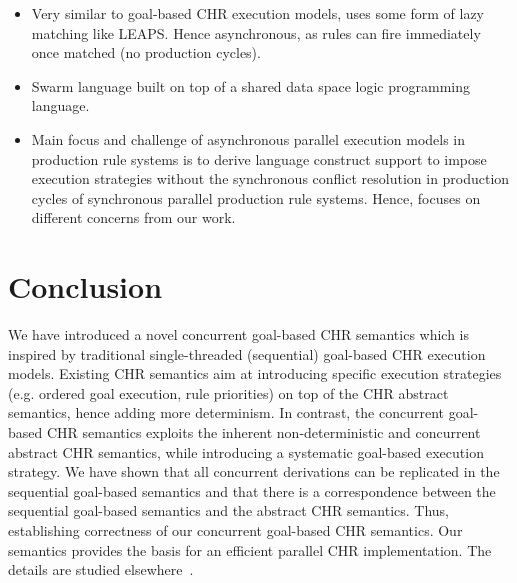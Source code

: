 \documentclass{tlp}
\begin{document}
{\begin{itemize}
\begin{itemize}
	              specified by the user.  
	        \item Very similar to goal-based CHR execution models, uses some form of lazy matching 
	              like LEAPS. Hence asynchronous, as rules can fire immediately once matched (no production
	              cycles).
	        \item Swarm language built on top of a shared data space logic programming language.
	        \item Main focus and challenge of asynchronous parallel execution models in production rule systems
	              is to derive language construct support to impose execution strategies without the synchronous
	              conflict resolution in production cycles of synchronous parallel production rule systems. Hence, 
	              focuses on different concerns from our work. 
        \end{itemize}
\end{itemize}
}




\section{Conclusion} \label{sec:conc}

We have introduced a novel concurrent goal-based CHR semantics which is inspired
by traditional single-threaded (sequential) goal-based CHR execution models. 
Existing CHR semantics aim at introducing specific execution strategies
(e.g. ordered goal execution, rule priorities) on top of the CHR abstract 
semantics, hence adding more determinism. In contrast, the concurrent goal-based 
CHR semantics exploits the inherent non-deterministic and concurrent abstract CHR 
semantics, while introducing a systematic goal-based execution strategy.
We have shown that all concurrent derivations 
can be replicated in the sequential goal-based semantics and that there is a 
correspondence between the sequential goal-based semantics and the abstract CHR 
semantics. Thus, establishing correctness of our concurrent goal-based CHR semantics. 
Our semantics provides the basis for an efficient parallel CHR implementation.
The details are studied elsewhere~\cite{parallel-chr}.
\end{document}
